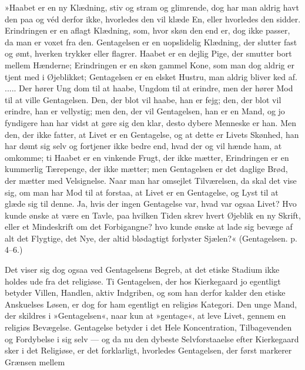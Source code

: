 \documentclass[12pt,a4paper,openany]{book}
\newcommand{\opage}[1]{\marginnote{\footnotesize\textit{[#1]}}}
\begin{document}
»Haabet er en ny Klædning, stiv og stram og glimrende,
dog har man aldrig havt den paa og véd derfor
ikke, hvorledes den vil klæde En, eller hvorledes den
sidder. Erindringen er en aflagt Klædning, som, hvor
skøn den end er, dog ikke passer, da man er voxet fra
den. Gentagelsen er en uopslidelig Klædning, der slutter
fast og ømt, hverken trykker eller flagrer. Haabet er
en dejlig Pige, der smutter bort mellem Hænderne;
Erindringen er en skøn gammel Kone, som man dog
aldrig er tjent med i Øjeblikket; Gentagelsen er en elsket
Hustru, man aldrig bliver ked af. ..... Der hører Ung%
\opage{97}dom til at haabe, Ungdom til at erindre, men der hører
Mod til at ville Gentagelsen. Den, der blot vil haabe,
han er fejg; den, der blot vil erindre, han er vellystig;
men den, der vil Gentagelsen, han er en Mand, og jo
fyndigere han har vidst at gøre sig den klar, desto dybere
Menneske er han. Men den, der ikke fatter, at Livet
er en Gentagelse, og at dette er Livets Skønhed, han
har dømt sig selv og fortjener ikke bedre end, hvad der
og vil hænde ham, at omkomme; ti Haabet er en vinkende
Frugt, der ikke mætter, Erindringen er en kummerlig
Tærepenge, der ikke mætter; men Gentagelsen er
det daglige Brød, der mætter med Velsignelse. Naar
man har omsejlet Tilværelsen, da skal det vise sig, om
man har Mod til at forstaa, at Livet er en Gentagelse,
og Lyst til at glæde sig til denne. Ja, hvis der ingen
Gentagelse var, hvad var ogsaa Livet? Hvo kunde ønske
at være en Tavle, paa hvilken Tiden skrev hvert Øjeblik
en ny Skrift, eller et Mindeskrift om det Forbigangne?
hvo kunde ønske at lade sig bevæge af alt det Flygtige,
det Nye, der altid blødagtigt forlyster Sjælen?« (Gentagelsen.
p. 4--6.)

Det viser sig dog ogsaa ved Gentagelsens Begreb,
at det etiske Stadium ikke holdes ude fra det religiøse.
Ti Gentagelsen, der hos Kierkegaard jo egentligt betyder
Villen, Handlen, aktiv Indgriben, og som han derfor
kalder den etiske Anskuelses Løsen, er dog for ham
egentligt en religiøs Kategori. Den unge Mand, der
skildres i »Gentagelsen«, naar kun at »gentage«, at leve
Livet, gennem en religiøs Bevægelse. Gentagelse betyder
i det Hele Koncentration, Tilbagevenden og Fordybelse
i sig selv --- og da nu den dybeste Selvforstaaelse efter
Kierkegaard sker i det Religiøse, er det forklarligt, hvorledes
Gentagelsen, der først markerer Grænsen mellem
\end{document}
